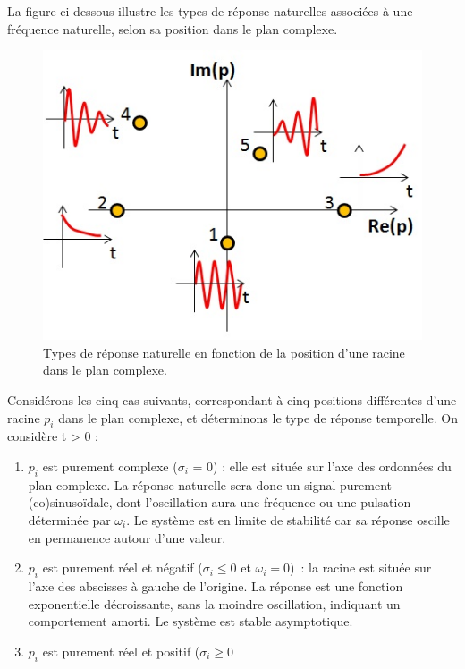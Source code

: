 \begin{remark}{}
        La figure ci-dessous illustre les types de réponse naturelles
        associées à une fréquence naturelle, selon sa position dans le
        plan complexe.
	\begin{figure}[htbp]
          \centering
          \includegraphics[scale=0.5]{images/reponse_vs_p.jpg}
          \caption{Types de réponse naturelle en fonction de la
            position d'une racine dans le plan complexe.}
          \label{Fig:reponse_vs_p}
	\end{figure}
        Considérons les cinq cas suivants, correspondant à cinq
        positions différentes d'une racine $p_{i}$ dans le plan
        complexe, et déterminons le type de réponse temporelle. On
        considère t > 0 :
	\begin{enumerate}
        \item $p_{i}$ est purement complexe ($\sigma_{i}$ = 0) : elle
          est située sur l'axe des ordonnées du plan complexe. La réponse
          naturelle sera donc un signal purement (co)sinusoïdale, dont
          l'oscillation aura une fréquence ou une pulsation déterminée
          par $\omega_{i}$. Le système est en limite de stabilité car
          sa réponse oscille en permanence autour d'une valeur.
        \item $p_{i}$ est purement réel et négatif ($ \sigma_i\leq 0$
          et $ \omega_i = 0$)~: la racine est située sur l'axe des
          abscisses à gauche de l'origine. La réponse est une fonction
          exponentielle décroissante, sans la moindre oscillation,
          indiquant un comportement amorti. Le système est stable
          asymptotique.
        \item $p_{i}$ est purement réel et positif ($ \sigma_i\geq 0$

\end{enumerate}
\end{remark}
